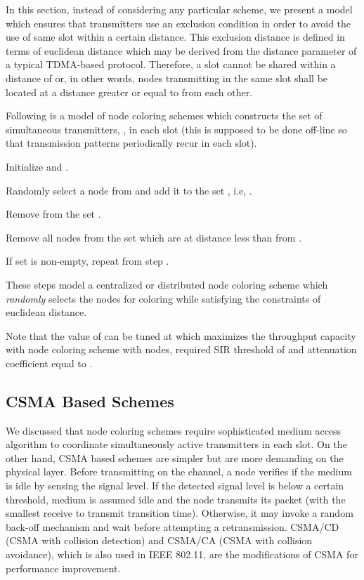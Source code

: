 \documentclass[12pt,english]{article}
\begin{document}
In this section, instead of considering any particular scheme, we present a model which ensures that transmitters use an exclusion condition in order to avoid the use of same slot within a certain distance. This exclusion distance is defined in terms of euclidean distance  which may be derived from the distance parameter of a typical TDMA-based protocol. Therefore, a slot cannot be shared within a distance of  or, in other words, nodes transmitting in the same slot shall be located at a distance greater or equal to  from each other.  

Following is a model of node coloring schemes which constructs the set of simultaneous transmitters, , in each slot (this is supposed to be done off-line so that transmission patterns periodically recur in each slot).
\begin{compactenum}
\item Initialize  and .
\item Randomly select a node  from  and add it to the set , i.e, . 
\item Remove  from the set .
\item Remove all nodes from the set  which are at distance less than  from .
\item If set  is non-empty, repeat from step .
\end{compactenum}
These steps model a centralized or distributed node coloring scheme which {\em randomly} selects the nodes for coloring while satisfying the constraints of euclidean distance. 

Note that the value of  can be tuned at  which maximizes the throughput capacity with node coloring scheme with  nodes, required SIR threshold of  and attenuation coefficient equal to .

\subsection{CSMA Based Schemes}
\label{sec:csma}

We discussed that node coloring schemes require sophisticated medium access algorithm to coordinate simultaneously active transmitters in each slot. On the other hand, CSMA based schemes are simpler but are more demanding on the physical layer. Before transmitting on the channel, a node verifies if the medium is idle by sensing the signal level. If the detected signal level is below a certain threshold, medium is assumed idle and the node transmits its packet  (with the smallest receive to transmit transition time). Otherwise, it may invoke a random back-off mechanism and wait before attempting a retransmission. CSMA/CD (CSMA with collision detection) and CSMA/CA (CSMA with collision avoidance), which is also used in IEEE 802.11, are the modifications of CSMA for performance improvement. 
\end{document}
